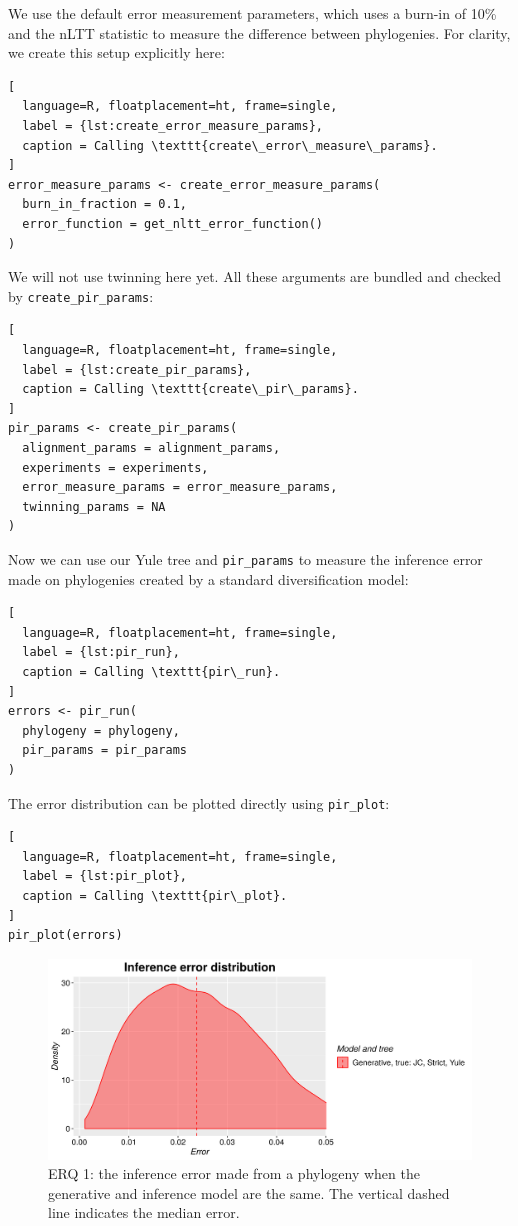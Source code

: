 \documentclass{article}
\begin{document}
We use the default error measurement
parameters, which uses a burn-in of 10\% and the nLTT statistic to
measure the difference between phylogenies. For clarity,
we create this setup explicitly here:

\begin{lstlisting}[
  language=R, floatplacement=ht, frame=single,
  label = {lst:create_error_measure_params},
  caption = Calling \texttt{create\_error\_measure\_params}.
]
error_measure_params <- create_error_measure_params(
  burn_in_fraction = 0.1, 
  error_function = get_nltt_error_function()
)
\end{lstlisting}

We will not use twinning here yet.  
All these arguments are bundled
and checked by \verb;create_pir_params;:

\begin{lstlisting}[
  language=R, floatplacement=ht, frame=single,
  label = {lst:create_pir_params},
  caption = Calling \texttt{create\_pir\_params}.
]
pir_params <- create_pir_params(
  alignment_params = alignment_params,
  experiments = experiments,
  error_measure_params = error_measure_params,
  twinning_params = NA
)
\end{lstlisting}

Now we can use our Yule tree and \verb;pir_params; to measure 
the inference error made on phylogenies
created by a standard diversification model:

\begin{lstlisting}[
  language=R, floatplacement=ht, frame=single,
  label = {lst:pir_run},
  caption = Calling \texttt{pir\_run}.
]
errors <- pir_run(
  phylogeny = phylogeny,
  pir_params = pir_params
)
\end{lstlisting}

The error distribution can be plotted directly using \verb;pir_plot;:

\begin{lstlisting}[
  language=R, floatplacement=ht, frame=single,
  label = {lst:pir_plot},
  caption = Calling \texttt{pir\_plot}.
]
pir_plot(errors)
\end{lstlisting}

\begin{figure}[H]
  \includegraphics[width=\textwidth]{example_1/errors.png}
  \caption{
    ERQ 1: the inference error made from a phylogeny 
    when the generative and inference model are the same.
    The vertical dashed line indicates the median error.
  }
  \label{fig:example_1}
\end{figure}
\end{document}
